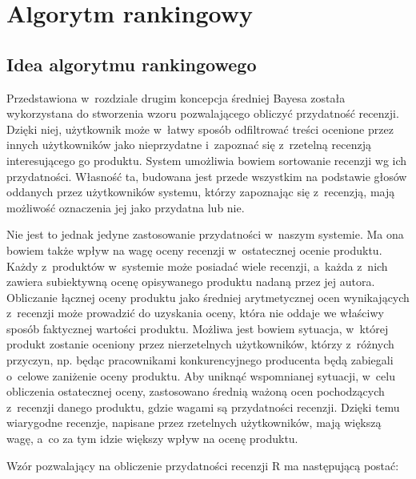 \chapter{Algorytm rankingowy}

\section{Idea algorytmu rankingowego}

Przedstawiona w~rozdziale drugim koncepcja średniej Bayesa została wykorzystana do stworzenia wzoru pozwalającego obliczyć przydatność recenzji. Dzięki niej, użytkownik może w~łatwy sposób odfiltrować treści ocenione przez innych użytkowników jako nieprzydatne i~zapoznać się z~rzetelną recenzją interesującego go produktu. System umożliwia bowiem sortowanie recenzji wg ich przydatności. Własność ta, budowana jest przede wszystkim na podstawie głosów oddanych przez użytkowników systemu, którzy zapoznając się z~recenzją, mają możliwość oznaczenia jej jako przydatna lub nie.

Nie jest to jednak jedyne zastosowanie przydatności w~naszym systemie. Ma ona bowiem także wpływ na wagę oceny recenzji w~ostatecznej ocenie produktu. Każdy z~produktów w~systemie może posiadać wiele recenzji, a~każda z~nich zawiera subiektywną ocenę opisywanego produktu nadaną przez jej autora. Obliczanie łącznej oceny produktu jako średniej arytmetycznej ocen wynikających z~recenzji może prowadzić do uzyskania oceny, która nie oddaje we właściwy sposób faktycznej wartości produktu. Możliwa jest bowiem sytuacja, w~której produkt zostanie oceniony przez nierzetelnych użytkowników, którzy z~różnych przyczyn, np. będąc pracownikami konkurencyjnego producenta będą zabiegali o~celowe zaniżenie oceny produktu. Aby uniknąć wspomnianej sytuacji, w~celu obliczenia ostatecznej oceny, zastosowano średnią ważoną ocen pochodzących z~recenzji danego produktu, gdzie wagami są przydatności recenzji. Dzięki temu wiarygodne recenzje, napisane przez rzetelnych użytkowników, mają większą wagę, a~co za tym idzie większy wpływ na ocenę produktu.

Wzór pozwalający na obliczenie przydatności recenzji R ma następującą postać:

